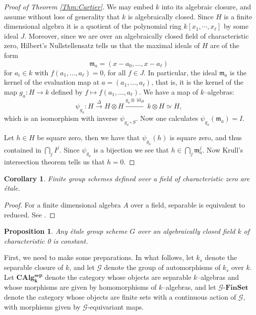\documentclass{article}
\theoremstyle{plain}
\newtheorem{Cor}[Th]{Corollary}
\newtheorem{Prop}[Th]{Proposition}
\theoremstyle{definition}
\DeclareMathOperator{\id}{id}
\newcommand{\mf}{\mathfrak}
\begin{document}
\begin{proof}[Proof of Theorem \ref{Thm:Cartier}] We may embed $k$ into its algebraic closure, and assume without loss of generality that $k$ is algebraically closed. Since $H$ is a finite dimensional algebra it is a quotient of the polynomial ring $k[x_1, \cdots, x_\ell]$ by some ideal $J$. Moreover, since we are over an algebraically closed field of characteristic zero, Hilbert's Nullstellensatz tells us that the maximal ideals of $H$ are of the form 
\[
\mf{m}_a=(x-a_0, \dots, x-a_\ell)
\]
for $a_i \in k$ with $f(a_1, \dots, a_\ell)=0$, for all $f\in J$. In particular, the ideal $\mf{m}_a$ is the kernel of the evaluation map at $a=(a_1, \dots, a_\ell)$, that is, it is the kernel of the map $g_a:H\to k$ defined by $f \mapsto f(a_1, \dots, a_\ell)$. We have a map of $k$--algebras: 
\[
\psi_{g_a}\colon H\xrightarrow[]{\Delta} H\otimes H\xrightarrow{g_a\otimes \id_H}k\otimes H \simeq H,
\]
which is an isomorphism with inverse $\psi_{g_a \circ S}$. Now one calculates $\psi_{g_a}(\mf{m}_a)=I$.

Let $h\in H$ be square zero, then we have that $\psi_{g_a}(h)$ is square zero, and thus contained in $\bigcap_j I^j$. Since $\psi_{g_a}$ is a bijection we see that $h\in \bigcap_j \mf{m}_a^j$. Now Krull's intersection theorem tells us that $h=0$.
\end{proof}

\begin{Cor}
    Finite group schemes defined over a field of characteristic zero are \'etale.
\end{Cor}

\begin{proof}
    For a finite dimensional algebra $A$ over a field, separable is equivalent to reduced. See \cite[Section 6.2]{Wat79}. 
\end{proof}

\begin{Prop}\label{Prop:etale in charc 0 are constant}
Any \'etale group scheme $G$ over an algebraically closed field $k$ of characteristic 0 is constant.  
\end{Prop}

First, we need to make some preparations. In what follows, let $k_s$ denote the separable closure of $k$, and let $\mathcal{G}$ denote the group of automorphisms of $k_s$ over $k$. Let  $\mathbf{CAlg_k^\textrm{sep}}$ denote the category whose objects are separable $k$--algebras and whose morphisms are given by homomorphisms of $k$--algebras, and let  $\mathcal{G}$-$\mathbf{FinSet}$ denote the category whose objects are finite sets with a continuous action of $\mathcal{G}$, with morphisms given by $\mathcal{G}$-equivariant maps. 
\end{document}
